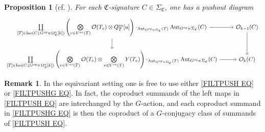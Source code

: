 \documentclass[a4paper,10pt
,draft
]{article}%
\numberwithin{equation}{section}
\numberwithin{figure}{section}
\newtheorem{proposition}[equation]{Proposition}%
\theoremstyle{definition} %
\newtheorem{remark}[equation]{Remark}%
\newcommand{\Sym}{\ensuremath{\mathsf{Sym}}}%
\DeclareMathOperator{\Aut}{Aut}%
\DeclareMathOperator{\Iso}{Iso}
\newcommand{\V}{\ensuremath{\mathcal V}}
\renewcommand{\O}{\ensuremath{\mathcal O}}
\newcommand{\1}{\ensuremath{\mathbbm 1}}%
\newcommand{\SC}{\Sigma_{\mathfrak C}}
\newcommand{\OC}{\Omega_{\mathfrak C}}
\begin{document}
\begin{proposition}[{cf. \cite[Prop. 5.66]{BP_geo}}]
      \label{FILTPUSHG PROP}
For each $\mathfrak C$-signature $C \in \Sigma_{\mathfrak C}$, one has a pushout diagram
      \vspace{-10pt}
\begin{align}\label{FILTPUSHG EQ}
\begin{tikzcd}[ampersand replacement=\&]
	\mathop{\coprod}\limits_{[T] \in \Iso(C \downarrow G^{op} \ltimes \Omega_{\mathfrak C}^a[k])}
	\left(
		\mathop{\bigotimes}\limits_{v \in V^{ac}(T)} \O(T_v) \otimes
		Q^{in}_T[u]
	\right) \cdot_{\Aut_{G^{op} \ltimes \OC}(T)} \Aut_{G^{op} \ltimes \SC}(C)
		\arrow[r] \arrow[d]
\&
	\O_{k-1}(C) \arrow[d]
\\                  
	\mathop{\coprod}\limits_{[T] \in \Iso(C \downarrow G^{op} \ltimes \Omega_{\mathfrak C}^a[k])}
	\left(
		\mathop{\bigotimes}\limits_{v \in V^{ac}(T)} \O(T_v) \otimes
		\mathop{\bigotimes}\limits_{v \in V^{in}(T)} Y(T_v)
	\right) \cdot_{\Aut_{G^{op} \ltimes \OC}(T)} \Aut_{G^{op} \ltimes \SC}(C)
		\arrow[r]
\&
	\O_k(C)
\end{tikzcd}
\end{align}
\end{proposition}



\begin{remark} 
In the equivariant setting one is free to use either \eqref{FILTPUSH EQ} or \eqref{FILTPUSHG EQ}.
In fact, the coproduct summands of the left maps in \eqref{FILTPUSH EQ} are interchanged by the $G$-action, 
and each coproduct summand in \eqref{FILTPUSHG EQ} is then the coproduct of a $G$-conjugacy class of summands of \eqref{FILTPUSH EQ}.
%
%
\end{remark}
\end{document}
